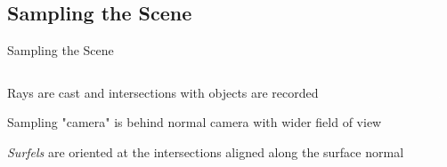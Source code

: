 \documentclass[10pt,compress,professionalfont]{beamer}
\begin{document}
\subsection{Sampling the Scene}
\begin{frame}{Sampling the Scene}

    \begin{columns}
        \begin{column}{0.5\textwidth}

    \vspace{-5mm}
    Rays are cast and intersections with objects are recorded\\
    \vspace{8mm}

    Sampling "camera" is behind normal camera with wider field of view\\
    \vspace{8mm}

    \textit{Surfels} are oriented at the intersections aligned along the surface normal

        \end{column}
        \begin{column}{0.5\textwidth}
            \vspace{-4mm}
            \includegraphics[width=\textwidth]{../img/diag/surfel_samp_mod.pdf}\\
        \end{column}
    \end{columns}

\end{frame}
\end{document}
